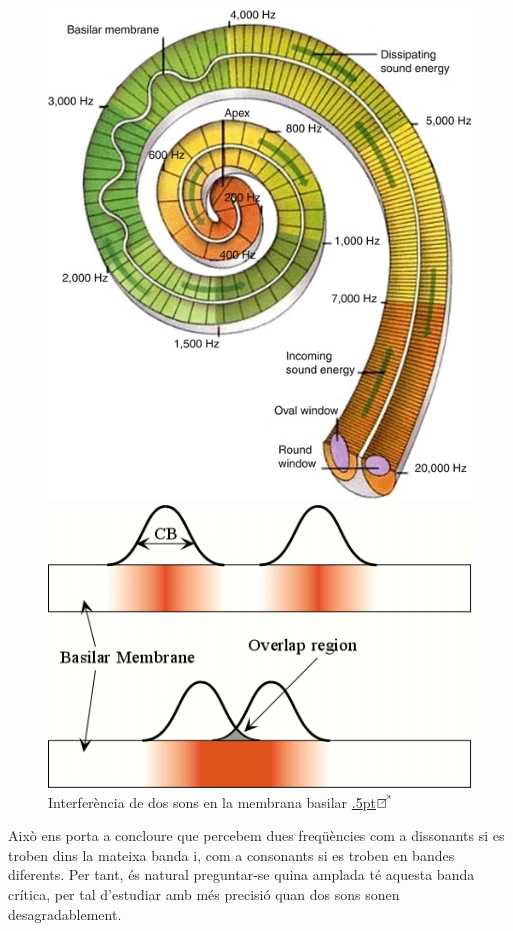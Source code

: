 \documentclass{article}
\theoremstyle{math}
\theoremstyle{TheoremNum}
\newcommand{\0}{\ensuremath{\vb{0}}}
\newcommand\enllas{\raise.5pt\hbox{$\boxempty\kern-4.85pt{}^{\nearrow}$}\kern-2pt}
\begin{document}
\begin{figure}[ht]
    \begin{minipage}[c]{0.49\linewidth}
        \centering
        \includegraphics[height=0.6\linewidth]{Imatges_beamer2/coclea.png}
        \caption{Estructura de la còclea \href{https://www.pinterest.com/pin/336995984614355654/}{\enllas}}
        \label{coclea}
    \end{minipage}
    \hfill
    \begin{minipage}[c]{0.49\linewidth}
        \centering
        \includegraphics[height=0.6\linewidth]{Imatges_beamer2/basilar_membrane.jpg}
        \caption{Interferència de dos sons en la membrana basilar \href{https://www.phys.uconn.edu/~gibson/Notes/Section7_3/Sec7_3.htm}{\enllas}}
        \label{membrana}
    \end{minipage}
\end{figure}
Això ens porta a concloure que percebem dues freqüències com a dissonants si es troben dins la mateixa banda i, com a consonants si es troben en bandes diferents. Per tant, és natural preguntar-se quina amplada té aquesta banda crítica, per tal d'estudiar amb més precisió quan dos sons sonen desagradablement.\par
\end{document}
